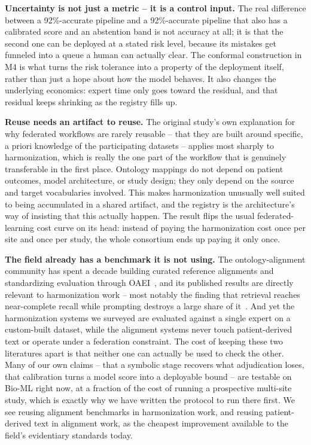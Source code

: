\documentclass[conference]{IEEEtran}
\begin{document}
\textbf{Uncertainty is not just a metric -- it is a control input.} The real difference between a 92\%-accurate pipeline and a 92\%-accurate pipeline that also has a calibrated score and an abstention band is not accuracy at all; it is that the second one can be deployed at a stated risk level, because its mistakes get funneled into a queue a human can actually clear. The conformal construction in M4 is what turns the risk tolerance into a property of the deployment itself, rather than just a hope about how the model behaves. It also changes the underlying economics: expert time only goes toward the residual, and that residual keeps shrinking as the registry fills up.

\textbf{Reuse needs an artifact to reuse.} The original study's own explanation for why federated workflows are rarely reusable -- that they are built around specific, a priori knowledge of the participating datasets -- applies most sharply to harmonization, which is really the one part of the workflow that is genuinely transferable in the first place. Ontology mappings do not depend on patient outcomes, model architecture, or study design; they only depend on the source and target vocabularies involved. This makes harmonization unusually well suited to being accumulated in a shared artifact, and the registry is the architecture's way of insisting that this actually happen. The result flips the usual federated-learning cost curve on its head: instead of paying the harmonization cost once per site and once per study, the whole consortium ends up paying it only once.

\textbf{The field already has a benchmark it is not using.} The ontology-alignment community has spent a decade building curated reference alignments and standardizing evaluation through OAEI~\cite{b55}, and its published results are directly relevant to harmonization work -- most notably the finding that retrieval reaches near-complete recall while prompting destroys a large share of it~\cite{b54}. And yet the harmonization systems we surveyed are evaluated against a single expert on a custom-built dataset, while the alignment systems never touch patient-derived text or operate under a federation constraint. The cost of keeping these two literatures apart is that neither one can actually be used to check the other. Many of our own claims -- that a symbolic stage recovers what adjudication loses, that calibration turns a model score into a deployable bound -- are testable on Bio-ML right now, at a fraction of the cost of running a prospective multi-site study, which is exactly why we have written the protocol to run there first. We see reusing alignment benchmarks in harmonization work, and reusing patient-derived text in alignment work, as the cheapest improvement available to the field's evidentiary standards today.
\end{document}
